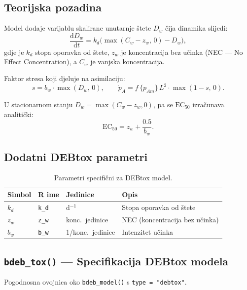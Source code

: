 \documentclass[11pt,a4paper]{article}
\newcommand{\fn}[1]{\texttt{#1()}}
\newcommand{\code}[1]{\texttt{#1}}
\begin{document}
\subsection{Teorijska pozadina}

Model dodaje varijablu skalirane unutarnje štete $D_w$ čija dinamika
slijedi:
\begin{equation}
\frac{\mathrm{d}D_w}{\mathrm{d}t} = k_d\bigl(\max(C_w - z_w,\, 0) - D_w\bigr),
\end{equation}
gdje je $k_d$ stopa oporavka od štete, $z_w$ je koncentracija bez učinka
(NEC --- No Effect Concentration), a $C_w$ je vanjska koncentracija.

Faktor stresa koji djeluje na asimilaciju:
\begin{equation}
s = b_w \cdot \max(D_w,\, 0), \qquad
\dot{p}_A = f\,\{p_{Am}\}\,L^2 \cdot \max(1 - s,\, 0).
\end{equation}

U stacionarnom stanju $D_w = \max(C_w - z_w, 0)$, pa se $\text{EC}_{50}$
izračunava analitički:
\begin{equation}
\text{EC}_{50} = z_w + \frac{0.5}{b_w}.
\end{equation}

\subsection{Dodatni DEBtox parametri}

\begin{table}[H]
\centering
\caption{Parametri specifični za DEBtox model.}
\begin{tabular}{llll}
\toprule
\textbf{Simbol} & \textbf{R ime} & \textbf{Jedinice} & \textbf{Opis} \\
\midrule
$k_d$ & \code{k\_d} & d$^{-1}$ & Stopa oporavka od štete \\
$z_w$ & \code{z\_w} & konc.\ jedinice & NEC (koncentracija bez učinka) \\
$b_w$ & \code{b\_w} & 1/konc.\ jedinice & Intenzitet učinka \\
\bottomrule
\end{tabular}
\end{table}

\subsection{\fn{bdeb\_tox} --- Specifikacija DEBtox modela}

Pogodnosna ovojnica oko \fn{bdeb\_model} s \code{type = "debtox"}.
\end{document}
